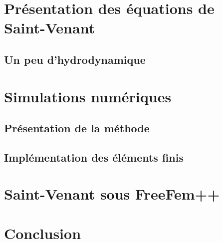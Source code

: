 \documentclass{report}
\begin{document}



\chapter{Présentation des équations de Saint-Venant}
\section{Un peu d'hydrodynamique}



\chapter{Simulations numériques}
\section{Présentation de la méthode}

\section{Implémentation des éléments finis}

\chapter{Saint-Venant sous FreeFem++}


\chapter{Conclusion}
\end{document}
